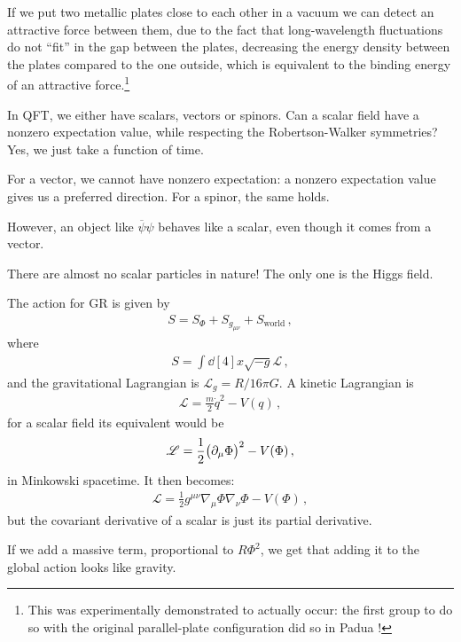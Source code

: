 \documentclass[main.tex]{subfiles}
\begin{document}
If we put two metallic plates close to each other in a vacuum we can detect an attractive force between them, due to the fact that long-wavelength fluctuations do not ``fit'' in the gap between the plates, decreasing the energy density between the plates compared to the one outside, which is equivalent to the binding energy of an attractive force.\footnote{This was experimentally demonstrated to actually occur: the first group to do so with the original parallel-plate configuration did so in Padua \cite[]{bressiMeasurementCasimirForce2002}!}


In QFT, we either have scalars, vectors or spinors.
Can a scalar field have a nonzero expectation value, while respecting the Robertson-Walker symmetries? Yes, we just take a function of time.

For a vector, we cannot have nonzero expectation: a nonzero expectation value gives us a preferred direction.
For a spinor, the same holds.

However, an object like \(\overline{\psi} \psi \) behaves like a scalar, even though it comes from a vector.

There are almost no scalar particles in nature! The only one is the Higgs field.

The action for GR is given by 
%
\begin{align}
  S = S_{\Phi } + S_{g_{\mu \nu }} + S_{\text{world}}
\,,
\end{align}
%
where 
%
\begin{align}
  S = \int \dd[4]{x} \sqrt{-g} \mathscr{L}
\,,
\end{align}
%
and the gravitational Lagrangian is \(\mathscr{L}_g = R /16 \pi G\).
A kinetic Lagrangian is  
%
\begin{align}
  \mathscr{L}  = \frac{m}{2} \dot{q}^2 - V(q)
\,,
\end{align}
%
for a scalar field its equivalent would be 
%
\begin{align}
  \mathscr{L} = \frac{1}{2} \qty(\partial_{\mu } \Phi )^2-V(\Phi )
\,,
\end{align}
%
in Minkowski spacetime. It then becomes: 
%
\begin{align}
  \mathscr{L} = \frac{1}{2} g^{\mu \nu } \nabla_{\mu } \Phi \nabla_{\nu } \Phi - V(\Phi )
\,,
\end{align}
%
but the covariant derivative of a scalar is just its partial derivative.

If we add a massive term, proportional to \(R \Phi^2\), we get that adding it to the global action looks like gravity.
\end{document}
